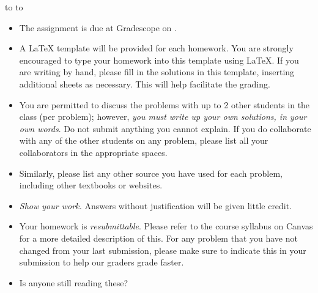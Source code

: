 \documentclass[10pt]{article}
\newcommand{\handout}{
   \renewcommand{\thepage}{H\hnumber-\arabic{page}}
   \noindent
   \begin{center}
      \vbox{
    \hbox to \columnwidth {\sc{\course} --- \prof \hfill}
    \vspace{-2mm}
    \hbox to \columnwidth {\sc due \MakeLowercase{\duedate} \duelocation\hfill {\Huge\color{mdb}H\hnumber.\yourname}}
      }
   \end{center}
   \vspace*{2mm}
}
\begin{document}
\handout
\begin{itemize}
\item The assignment is due at Gradescope on \duedate.

\item A LaTeX template will be provided for each homework. You are strongly encouraged to type your homework into this template using \LaTeX.  If you are writing by hand, please fill in the solutions in this template, inserting additional sheets as necessary. This will help facilitate the grading.

\item You are permitted to discuss the problems with up to 2 other students in the class (per problem); however, {\em you must write up your own solutions, in your own words}. Do not submit anything you cannot explain. If you do collaborate with any of the other students on any problem, please list all your collaborators in the appropriate spaces.

\item Similarly, please list any other source you have used for each problem, including other textbooks or websites.

\item {\em Show your work.} Answers without justification will be given little credit.

\item Your homework is \textit{resubmittable}. Please refer to the course syllabus on Canvas for a more detailed description of this. For any problem that you have not changed from your last submission, please make sure to indicate this in your submission to help our graders grade faster. 

\item Is anyone still reading these?

\end{itemize}

\end{document}

